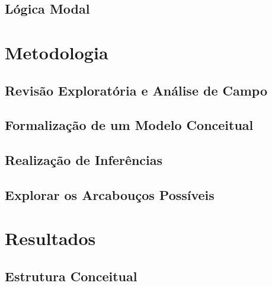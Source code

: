 \documentclass[openright]{normas-utf-tex} %
\begin{document}
	\section{Lógica Modal} \label{logic}

		


\chapter{Metodologia}
\label{chap:metod}

	

    \section{Revisão Exploratória e Análise de Campo} 
    
          
    
    \section{Formalização de um Modelo Conceitual} 
    
         
 
    \section{Realização de Inferências} 
    
        

    \section{Explorar os Arcabouços Possíveis} 
    
        


\chapter{Resultados}
\label{chap:resul}

	
	
	\section{Estrutura Conceitual} \label{estconceitual}
\end{document}
